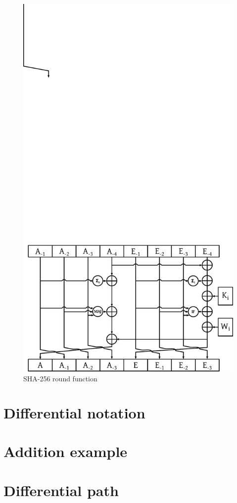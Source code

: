 \begin{figure}[t]
  \begin{center}
    \includegraphics{img/sha256.pdf}
    \caption{SHA-256 round function}
    \label{fig:sha256-round-function}
  \end{center}
\end{figure}

\section{Differential notation}
\label{sec:dc-notation}
%
\cite{char-2006}


\section{Addition example}
\section{Differential path}
